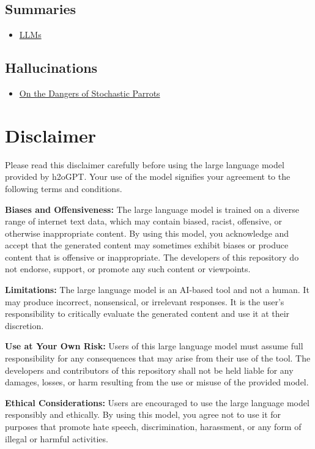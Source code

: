 \documentclass{article}
\begin{document}
\subsection*{Summaries}
\begin{itemize}
    \item \href{https://github.com/Mooler0410/LLMsPracticalGuide}{LLMs}
\end{itemize}

\subsection*{Hallucinations}
\begin{itemize}
    \item \href{https://dl.acm.org/doi/10.1145/3442188.3445922}{On the Dangers of Stochastic Parrots}
\end{itemize}

\section{Disclaimer}
Please read this disclaimer carefully before using the large language model provided by h2oGPT. Your use of the model signifies your agreement to the following terms and conditions.

\textbf{Biases and Offensiveness:} The large language model is trained on a diverse range of internet text data, which may contain biased, racist, offensive, or otherwise inappropriate content. By using this model, you acknowledge and accept that the generated content may sometimes exhibit biases or produce content that is offensive or inappropriate. The developers of this repository do not endorse, support, or promote any such content or viewpoints.

\textbf{Limitations:} The large language model is an AI-based tool and not a human. It may produce incorrect, nonsensical, or irrelevant responses. It is the user's responsibility to critically evaluate the generated content and use it at their discretion.

\textbf{Use at Your Own Risk:} Users of this large language model must assume full responsibility for any consequences that may arise from their use of the tool. The developers and contributors of this repository shall not be held liable for any damages, losses, or harm resulting from the use or misuse of the provided model.

\textbf{Ethical Considerations:} Users are encouraged to use the large language model responsibly and ethically. By using this model, you agree not to use it for purposes that promote hate speech, discrimination, harassment, or any form of illegal or harmful activities.
\end{document}
